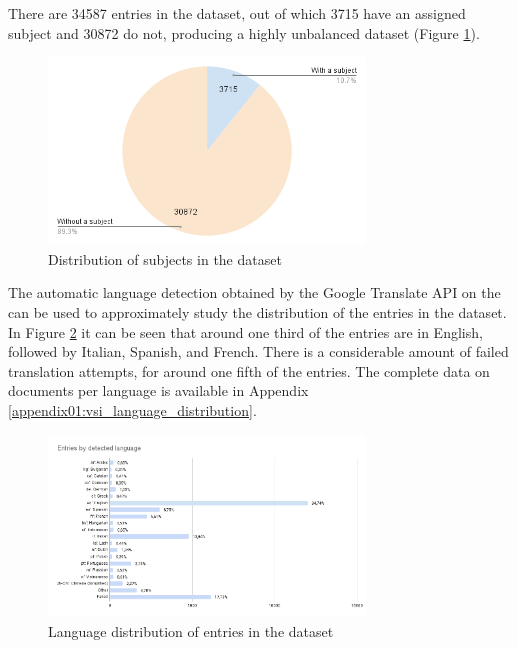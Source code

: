 \label{vsi_data_statistics}

There are 34587 entries in the dataset, out of which 3715 have an assigned subject and 30872 do not, producing a highly unbalanced dataset (Figure \ref{fig:04_naive_positives_and_negatives}). 

\begin{figure}
    \centering
    \includegraphics[width=0.75\textwidth]{Figures/04/naive_positives_and_negatives_chart.png}
    \caption{Distribution of subjects in the \VSI{} dataset}
    \label{fig:04_naive_positives_and_negatives}
\end{figure}

The automatic language detection obtained by the Google Translate API  on the \trafilaturaTitle{} can be used to approximately study the distribution of the entries in the dataset. In Figure \ref{fig:04_vsi_language_distribution} it can be seen that around one third of the entries are in English, followed by Italian, Spanish, and French. There is a considerable amount of failed translation attempts, for around one fifth of the entries. The complete data on documents per language is available in Appendix \ref{appendix01:vsi_language_distribution}.
 
\begin{figure}
    \centering
    \includegraphics[width=0.75\textwidth]{Figures/04/Entries by detected language.png}
    \caption{Language distribution of entries in the \VSI{} dataset}
    \label{fig:04_vsi_language_distribution}
\end{figure}

